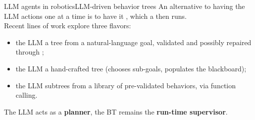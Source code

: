 \begin{frame}{LLM agents in robotics}{LLM-driven behavior trees}
  \justifying
  An alternative to having the LLM  actions one at a time is to have it , which a  then runs.\\
  \bigskip
  Recent lines of work explore three flavors:
  \begin{itemize}
    \item the LLM  a tree from a natural-language goal, validated and possibly repaired through ;
    \item the LLM  a hand-crafted tree (chooses sub-goals, populates the blackboard);
    \item the LLM  subtrees from a library of pre-validated behaviors, via function calling.
  \end{itemize}
  \bigskip
  \begin{block}{}
    \centering
    The LLM acts as a \textbf{planner}, the BT remains the \textbf{run-time supervisor}.
  \end{block}
\end{frame}

